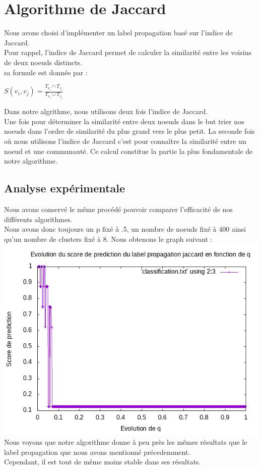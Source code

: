 \documentclass[a4paper,10pt]{report}
\begin{document}
\section{Algorithme de Jaccard}
Nous avons choisi d'implémenter un label propagation basé sur l'indice de Jaccard. 
\\
\newline
Pour rappel, l'indice de Jaccard permet de calculer la similarité entre les voisins de deux noeuds distincts.
\\
sa formule est donnée par :
\\
\begin{center}
$S(v_i,v_j) = \frac{ T_{v_i} \cap T_{v_j} }{T_{v_i} \cup T_{v_j}}$
\end{center}
Dans notre algrithme, nous utilisons deux fois l'indice de Jaccard. 
\\
Une fois pour déterminer la similarité entre deux noeuds dans le but trier nos noeuds dans l'ordre de similarité du plus grand vers le plus petit.
\newline
La seconde fois où nous utilisons l'indice de Jaccard c'est pour connaître la similarité entre un noeud et une communauté.
\newline
Ce calcul constitue la partie la plus fondamentale de notre algorithme.
\clearpage
\subsection{Analyse expérimentale}
Nous avons conservé le même procédé pouvoir comparer l'efficacité de nos différents algorithmes.
\\
Nous avons donc toujours un p fixé à .5, un nombre de noeuds fixé à 400 ainsi qu'un nombre de clusters fixé à 8.
Nous obtenons le graph suivant :
\newline
\\
\includegraphics[scale=0.6]{./Datas/classificationp05ScoreJaccard.png}
\\
Nous voyons que notre algorithme donne à peu près les mêmes résultats que le label propagation que nous avons mentionné précedemment.
\\
Cependant, il est tout de même moins stable dans ses résultats.
\end{document}
